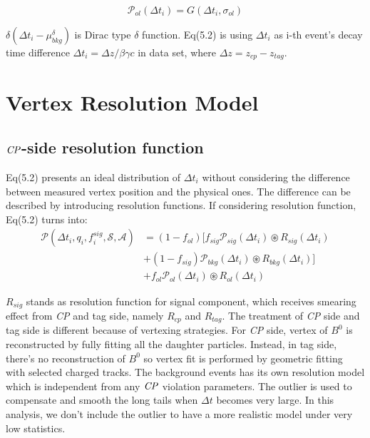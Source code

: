 \begin{equation}
\mathcal{P}_{ol} (\Delta t_i)=
G(\Delta t_i, \sigma_{ol})
\end{equation}

$\delta(\Delta t_i-\mu_{bkg}^{\delta})$ is Dirac type $\delta$ function. Eq(5.2) is using $\Delta t_i$ as i-th event's  decay time difference $\Delta t_i = \Delta z / \beta\gamma c$ in data set, where $\Delta z = z_{cp}-z_{tag}$. 

\section{Vertex Resolution Model}
\subsection{$\it{CP}$-side resolution function}
Eq(5.2) presents an ideal distribution of $\Delta t_i$ without considering the difference between measured vertex position and the physical ones. The difference can be described by introducing resolution functions. If considering resolution function, Eq(5.2) turns into: 
\begin{equation}
\begin{split}
\mathcal{P}(\Delta t_i,q_i,f_i^{sig},\mathcal{S},\mathcal{A})
&=(1-f_{ol})\text{[}f_{sig}\mathcal{P}_{sig}(\Delta t_i)\circledast R_{sig}(\Delta t_i)\\
&+(1-f_{sig})\mathcal{P}_{bkg}(\Delta t_i)\circledast R_{bkg}(\Delta t_i)
\text{]}\\
&+f_{ol}\mathcal{P}_{ol}(\Delta t_i)\circledast R_{ol}(\Delta t_i)
\end{split}
\end{equation}

$R_{sig}$ stands as resolution function for signal component, which receives smearing effect from \textit{CP} and tag side, namely $R_{cp}$ and  $R_{tag}$. The treatment of \textit{CP} side and tag side is different because of vertexing strategies. For \textit{CP} side, vertex of $B^0$ is reconstructed by fully fitting all the daughter particles. Instead, in tag side, there's no reconstruction of $B^0$ so vertex fit is performed by geometric fitting with selected charged tracks. The background events has its own resolution model which is independent from any $\it{CP}$ violation parameters. The outlier is used to compensate and smooth the long tails when $\Delta t$ becomes very large. In this analysis, we don't include the outlier to have a more realistic model under very low statistics. 


